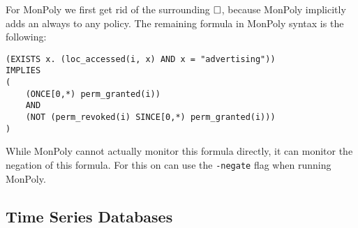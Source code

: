 For MonPoly we first get rid of the surrounding $\square$, because MonPoly implicitly adds an always to any policy.
The remaining formula in MonPoly syntax is the following:

\begin{verbatim}
(EXISTS x. (loc_accessed(i, x) AND x = "advertising")) 
IMPLIES 
(
    (ONCE[0,*) perm_granted(i)) 
    AND 
    (NOT (perm_revoked(i) SINCE[0,*) perm_granted(i)))
)
\end{verbatim}

While MonPoly cannot actually monitor this formula directly, it can monitor the negation of this formula.
For this on can use the \texttt{-negate} flag when running MonPoly.

\subsection{Time Series Databases}